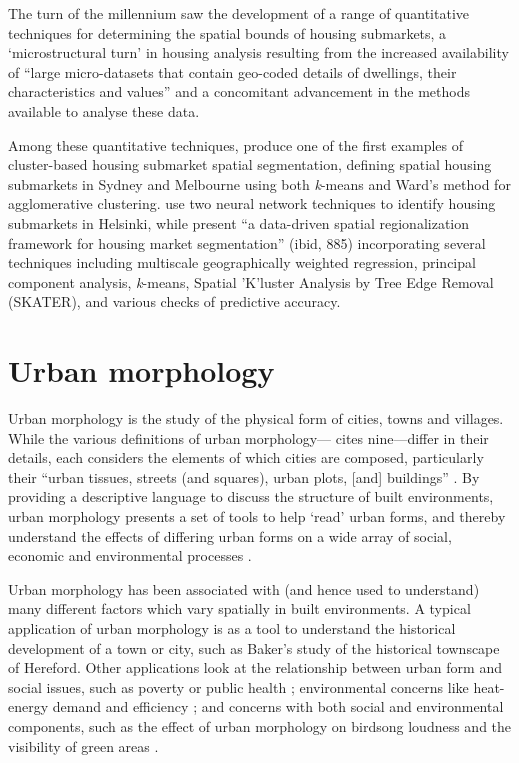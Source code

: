 \documentclass[a4paper, nobind]{templates/ociamthesis}
\begin{document}
The turn of the millennium saw the development of a range of quantitative techniques for determining the spatial bounds of housing submarkets, a `microstructural turn' in housing analysis \citep[2]{smith2013} resulting from the increased availability of ``large micro-datasets that contain geo-coded details of dwellings, their characteristics and values'' \citep[1447]{keskin2017} and a concomitant advancement in the methods available to analyse these data.

Among these quantitative techniques, \citet{bourassa1999} produce one of the first examples of cluster-based housing submarket spatial segmentation, defining spatial housing submarkets in Sydney and Melbourne using both \emph{k}-means and Ward's method for agglomerative clustering. \citet{kauko2002} use two neural network techniques to identify housing submarkets in Helsinki, while \citet{helbich2013} present ``a data-driven spatial regionalization framework for housing market segmentation'' (ibid, 885) incorporating several techniques including multiscale geographically weighted regression, principal component analysis, \emph{k}-means, Spatial 'K'luster Analysis by Tree Edge Removal (SKATER), and various checks of predictive accuracy.

\hypertarget{urban-morphology}{%
\section{Urban morphology}\label{urban-morphology}}

Urban morphology is the study of the physical form of cities, towns and villages. While the various definitions of urban morphology--- \citet{oliveira2016} cites nine---differ in their details, each considers the elements of which cities are composed, particularly their ``urban tissues, streets (and squares), urban plots, {[}and{]} buildings'' \citep[2]{oliveira2016}. By providing a descriptive language to discuss the structure of built environments, urban morphology presents a set of tools to help `read' urban forms, and thereby understand the effects of differing urban forms on a wide array of social, economic and environmental processes \citep[10]{kropf2017}.

Urban morphology has been associated with (and hence used to understand) many different factors which vary spatially in built environments. A typical application of urban morphology is as a tool to understand the historical development of a town or city, such as Baker's \citeyearpar{baker2009} study of the historical townscape of Hereford. Other applications look at the relationship between urban form and social issues, such as poverty \citep{vaughan2005} or public health \citep{sarkar2013}; environmental concerns like heat-energy demand and efficiency \citep{rode2014}; and concerns with both social and environmental components, such as the effect of urban morphology on birdsong loudness and the visibility of green areas \citep{hao2015}.
\end{document}
